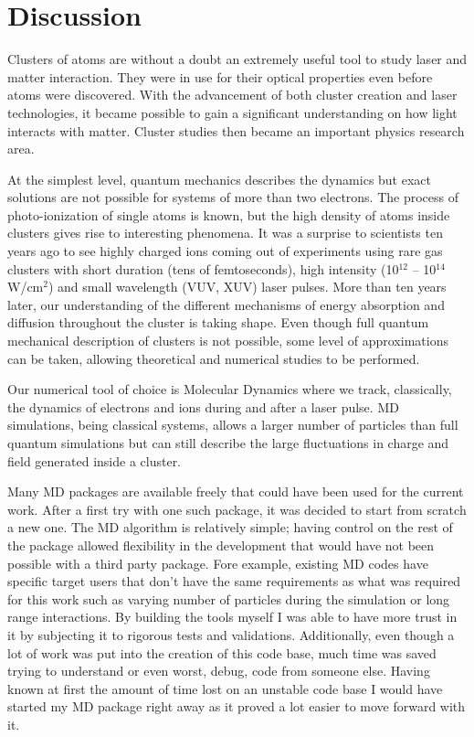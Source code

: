 \section{Discussion}

Clusters of atoms are without a doubt an extremely useful tool to study
laser and matter interaction. They were in use for their optical properties
even before atoms were discovered. With the advancement of both cluster creation
and laser technologies, it became possible to gain a significant understanding
on how light interacts with matter. Cluster studies then became an important
physics research area.

At the simplest level, quantum mechanics describes the dynamics but exact solutions
are not possible for systems of more than two electrons.
The process of photo-ionization of single atoms is known, but the high density
of atoms inside clusters gives rise to interesting phenomena. It was a surprise
to scientists ten years ago to see highly charged ions coming out of experiments
using rare gas clusters with short duration (tens of femtoseconds), high intensity
(10$^{12}$ -- 10$^{14}$ W/cm$^2$) and small wavelength (VUV, XUV) laser pulses.
More than ten years later, our understanding of the different mechanisms of energy
absorption and diffusion throughout the cluster is taking shape. Even though full
quantum mechanical description of clusters is not possible, some level of approximations
can be taken, allowing theoretical and numerical studies to be performed.

Our numerical tool of choice is Molecular Dynamics where we track, classically,
the dynamics of electrons and ions during and after a laser pulse. MD simulations,
being classical systems, allows a larger number of particles than full quantum
simulations but can still describe the large fluctuations in charge and field
generated inside a cluster.

Many MD packages are available freely that could have been used for
the current work. After a first try with one such package, it was decided to
start from scratch a new one. The MD algorithm is relatively simple; having
control on the rest of the package allowed flexibility in the development that
would have not been possible with a third party package. Fore example, existing
MD codes have specific target users that don't have the same requirements as what
was required for this work such as varying number of particles during the
simulation or long range interactions. By building the tools myself I was able
to have more trust in it by subjecting it to rigorous tests and validations.
Additionally, even though a lot of work was put into the creation of this code
base, much time was saved trying to understand or even worst, debug, code from
someone else. Having known at first the amount of time lost on an unstable code
base I would have started my MD package right away as it proved a lot easier
to move forward with it.


